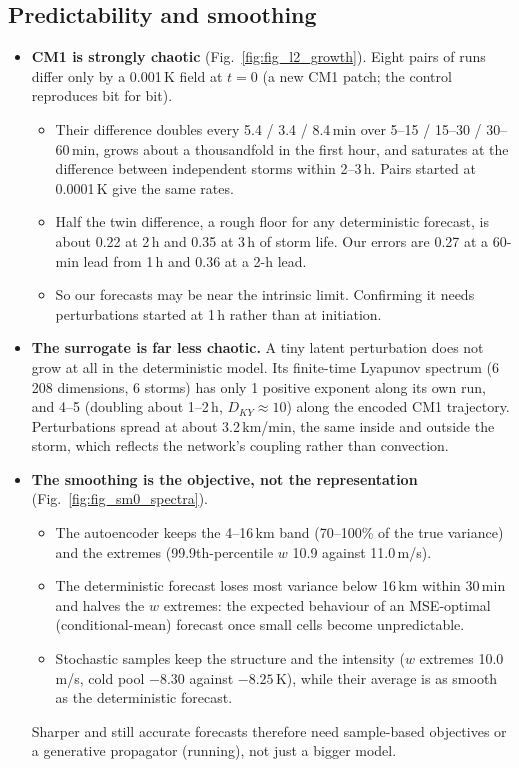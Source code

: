 \documentclass[11pt]{article}
\begin{document}
\subsection{Predictability and smoothing}
\begin{itemize}
\item \textbf{CM1 is strongly chaotic} (Fig.~\ref{fig:fig_l2_growth}). Eight pairs of runs differ only by a 0.001\,K field at $t=0$ (a new CM1 patch; the control reproduces bit for bit).
  \begin{itemize}
  \item Their difference doubles every 5.4 / 3.4 / 8.4\,min over 5--15 / 15--30 / 30--60\,min, grows about a thousandfold in the first hour, and saturates at the difference between independent storms within 2--3\,h. Pairs started at 0.0001\,K give the same rates.
  \item Half the twin difference, a rough floor for any deterministic forecast, is about 0.22 at 2\,h and 0.35 at 3\,h of storm life. Our errors are 0.27 at a 60-min lead from 1\,h and 0.36 at a 2-h lead.
  \item So our forecasts may be near the intrinsic limit. Confirming it needs perturbations started at 1\,h rather than at initiation.
  \end{itemize}
\item \textbf{The surrogate is far less chaotic.} A tiny latent perturbation does not grow at all in the deterministic model. Its finite-time Lyapunov spectrum (6\,208 dimensions, 6 storms) has only 1 positive exponent along its own run, and 4--5 (doubling about 1--2\,h, $D_{KY}\approx10$) along the encoded CM1 trajectory. Perturbations spread at about 3.2\,km/min, the same inside and outside the storm, which reflects the network's coupling rather than convection.
\item \textbf{The smoothing is the objective, not the representation} (Fig.~\ref{fig:fig_sm0_spectra}).
  \begin{itemize}
  \item The autoencoder keeps the 4--16\,km band (70--100\% of the true variance) and the extremes (99.9th-percentile $w$ 10.9 against 11.0\,m/s).
  \item The deterministic forecast loses most variance below 16\,km within 30\,min and halves the $w$ extremes: the expected behaviour of an MSE-optimal (conditional-mean) forecast once small cells become unpredictable.
  \item Stochastic samples keep the structure and the intensity ($w$ extremes 10.0\,m/s, cold pool $-8.30$ against $-8.25$\,K), while their average is as smooth as the deterministic forecast.
  \end{itemize}
  Sharper and still accurate forecasts therefore need sample-based objectives or a generative propagator (running), not just a bigger model.
\end{itemize}
\end{document}
